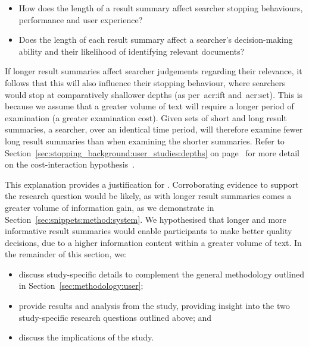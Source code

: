 \begin{itemize}
    \item{ How does the length of a result summary affect searcher stopping behaviours, performance and user experience?}
    \item{ Does the length of each result summary affect a searcher's decision-making ability and their likelihood of identifying relevant documents?}
\end{itemize}

If longer result summaries affect searcher judgements regarding their relevance, it follows that this will also influence their stopping behaviour, where searchers would stop at comparatively shallower depths (as per~\gls{acr:ift} and~\gls{acr:set}). This is because we assume that a greater volume of text will require a longer period of examination (a greater examination cost). Given sets of short and long result summaries, a searcher, over an identical time period, will therefore examine fewer long result summaries than when examining the shorter summaries. Refer to Section~\ref{sec:stopping_background:user_studies:depths} on page~\pageref{sec:stopping_background:user_studies:depths} for more detail on the cost-interaction hypothesis~\citep{azzopardi2011economics}.

This explanation provides a justification for . Corroborating evidence to support the research question would be likely, as with longer result summaries comes a greater volume of information gain, as we demonstrate in Section~\ref{sec:snippets:method:system}. We hypothesised that longer and more informative result summaries would enable participants to make better quality decisions, due to a higher information content within a greater volume of text. In the remainder of this section, we:

\begin{itemize}
    \item{discuss study-specific details to complement the general methodology outlined in Section~\ref{sec:methodology:user};}
    \item{provide results and analysis from the study, providing insight into the two study-specific research questions outlined above; and}
    \item{discuss the implications of the study.}
\end{itemize}

